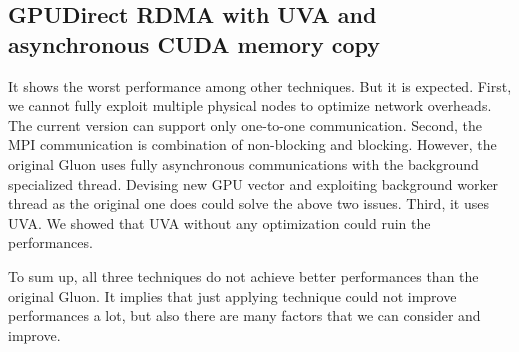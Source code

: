 \subsection{GPUDirect RDMA with UVA and asynchronous CUDA memory copy}
It shows the worst performance among other techniques.
But it is expected. First, we cannot fully exploit multiple physical nodes to 
optimize network overheads. The current version can support only one-to-one communication.
Second, the MPI communication is combination of non-blocking and blocking. However, the original Gluon 
uses fully asynchronous communications with the background specialized thread.
Devising new GPU vector and exploiting background worker thread as the original one does could solve the above two issues.
Third, it uses UVA. We showed that UVA without any optimization could ruin the performances.

To sum up, all three techniques do not achieve better performances than the original Gluon.
It implies that just applying technique could not improve performances a lot, but also there are many factors 
that we can consider and improve.
